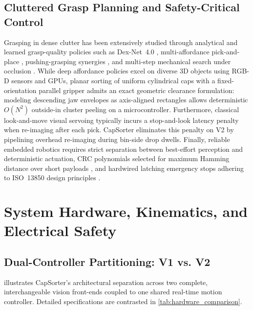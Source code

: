 \documentclass[10pt,twocolumn,letterpaper]{article}
\begin{document}
\subsection{Cluttered Grasp Planning and Safety-Critical Control}
Grasping in dense clutter has been extensively studied through analytical and learned grasp-quality policies such as Dex-Net~4.0 \cite{mahler2019learning}, multi-affordance pick-and-place \cite{zeng2018robotic}, pushing-grasping synergies \cite{zeng2018learning}, and multi-step mechanical search under occlusion \cite{danielczuk2019mechanical}. While deep affordance policies excel on diverse 3D objects using RGB-D sensors and GPUs, planar sorting of uniform cylindrical caps with a fixed-orientation parallel gripper admits an exact geometric clearance formulation: modeling descending jaw envelopes as axis-aligned rectangles allows deterministic $O(N^2)$ outside-in cluster peeling on a microcontroller. Furthermore, classical look-and-move visual servoing \cite{chaumette2006visual} typically incurs a stop-and-look latency penalty when re-imaging after each pick. CapSorter eliminates this penalty on V2 by pipelining overhead re-imaging during bin-side drop dwells. Finally, reliable embedded robotics requires strict separation between best-effort perception and deterministic actuation, CRC polynomials selected for maximum Hamming distance over short payloads \cite{koopman2004cyclic}, and hardwired latching emergency stops adhering to ISO~13850 design principles \cite{iso13850}.

\section{System Hardware, Kinematics, and Electrical Safety}
\label{sec:hardware}

\subsection{Dual-Controller Partitioning: V1 vs. V2}
 illustrates CapSorter's architectural separation across two complete, interchangeable vision front-ends coupled to one shared real-time motion controller. Detailed specifications are contrasted in \cref{tab:hardware_comparison}.
\end{document}
